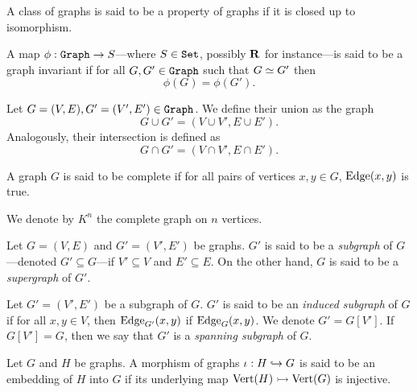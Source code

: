 \begin{definition}\label{def: graph-property}
A class of graphs is said to be a property of graphs if it is closed up to
isomorphism.
\end{definition}

\begin{definition}\label{def: graph-invariant}
A map \(\phi: {\texttt{Graph}} \to S\)---where \(S \in {\texttt{Set}}\), possibly \(\mathbf{R}\) for
instance---is said to be a graph invariant if for all \(G, G' \in
{\texttt{Graph}}\) such that \(G \simeq G'\) then
\[
  \phi(G) = \phi(G').
\]
\end{definition}

\begin{definition}\label{def: union-intersection-gph}
Let \(G = (V, E), G' = (V', E') \in {\texttt{Graph}}\). We define their union as the
graph
\[
  G \cup G' = (V \cup V', E \cup E').
\]
Analogously, their intersection is defined as
\[
  G \cap G' = (V \cap V', E \cap E').
\]
\end{definition}

\begin{definition}\label{def: complete-graph}
A graph \(G\) is said to be complete if for all pairs of vertices \(x, y \in
G\), \(\operatorname{Edge}(x, y)\) is true.
\end{definition}

\begin{notation}
We denote by \(K^n\) the complete graph on \(n\) vertices.
\end{notation}

\begin{definition}[Subgraph]
Let \(G = (V, E)\) and \(G' = (V', E')\) be graphs. \(G'\) is said to be a
\emph{subgraph} of \(G\)---denoted \(G' \subseteq G\)---if \(V' \subseteq
V\) and \(E' \subseteq E\). On the other hand, \(G\) is said to be a
\emph{supergraph} of \(G'\).
\end{definition}

\begin{definition}
Let \(G' = (V', E')\) be a subgraph of \(G\). \(G'\) is said to be an
\emph{induced subgraph} of \(G\) if for all \(x, y \in V\), then \(\operatorname{Edge}_{G'}(x,
y)\) if \(\operatorname{Edge}_G(x, y)\). We denote \(G' = G[V']\). If \(G[V'] = G\), then we say
that \(G'\) is a \emph{spanning subgraph} of \(G\).
\end{definition}

\begin{definition}\label{def: graph-embedding}
Let \(G\) and \(H\) be graphs. A morphism of graphs \(\iota: H \hookrightarrow G\) is
said to be an embedding of \(H\) into \(G\) if its underlying map \(\operatorname{Vert}(H) \rightarrowtail
\operatorname{Vert}(G)\) is injective.
\end{definition}

